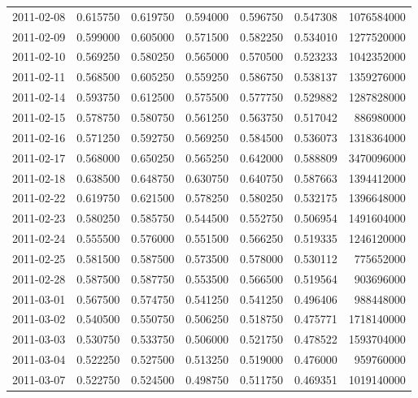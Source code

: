 \begin{tabular}{lrrrrrr}
2011-02-08 &    0.615750 &    0.619750 &    0.594000 &    0.596750 &    0.547308 &  1076584000 \\
2011-02-09 &    0.599000 &    0.605000 &    0.571500 &    0.582250 &    0.534010 &  1277520000 \\
2011-02-10 &    0.569250 &    0.580250 &    0.565000 &    0.570500 &    0.523233 &  1042352000 \\
2011-02-11 &    0.568500 &    0.605250 &    0.559250 &    0.586750 &    0.538137 &  1359276000 \\
2011-02-14 &    0.593750 &    0.612500 &    0.575500 &    0.577750 &    0.529882 &  1287828000 \\
2011-02-15 &    0.578750 &    0.580750 &    0.561250 &    0.563750 &    0.517042 &   886980000 \\
2011-02-16 &    0.571250 &    0.592750 &    0.569250 &    0.584500 &    0.536073 &  1318364000 \\
2011-02-17 &    0.568000 &    0.650250 &    0.565250 &    0.642000 &    0.588809 &  3470096000 \\
2011-02-18 &    0.638500 &    0.648750 &    0.630750 &    0.640750 &    0.587663 &  1394412000 \\
2011-02-22 &    0.619750 &    0.621500 &    0.578250 &    0.580250 &    0.532175 &  1396648000 \\
2011-02-23 &    0.580250 &    0.585750 &    0.544500 &    0.552750 &    0.506954 &  1491604000 \\
2011-02-24 &    0.555500 &    0.576000 &    0.551500 &    0.566250 &    0.519335 &  1246120000 \\
2011-02-25 &    0.581500 &    0.587500 &    0.573500 &    0.578000 &    0.530112 &   775652000 \\
2011-02-28 &    0.587500 &    0.587750 &    0.553500 &    0.566500 &    0.519564 &   903696000 \\
2011-03-01 &    0.567500 &    0.574750 &    0.541250 &    0.541250 &    0.496406 &   988448000 \\
2011-03-02 &    0.540500 &    0.550750 &    0.506250 &    0.518750 &    0.475771 &  1718140000 \\
2011-03-03 &    0.530750 &    0.533750 &    0.506000 &    0.521750 &    0.478522 &  1593704000 \\
2011-03-04 &    0.522250 &    0.527500 &    0.513250 &    0.519000 &    0.476000 &   959760000 \\
2011-03-07 &    0.522750 &    0.524500 &    0.498750 &    0.511750 &    0.469351 &  1019140000 \\

\end{tabular}
